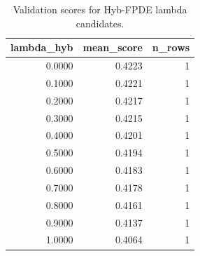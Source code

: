 \begin{table}[t]
\caption{Validation scores for Hyb-FPDE lambda candidates.}
\label{tab:lambda_distribution_computed}
\centering
\begin{tabular}{rrr}
\toprule
lambda\_hyb & mean\_score & n\_rows \\
\midrule
0.0000 & 0.4223 & 1 \\
0.1000 & 0.4221 & 1 \\
0.2000 & 0.4217 & 1 \\
0.3000 & 0.4215 & 1 \\
0.4000 & 0.4201 & 1 \\
0.5000 & 0.4194 & 1 \\
0.6000 & 0.4183 & 1 \\
0.7000 & 0.4178 & 1 \\
0.8000 & 0.4161 & 1 \\
0.9000 & 0.4137 & 1 \\
1.0000 & 0.4064 & 1 \\
\bottomrule
\end{tabular}

\end{table}
